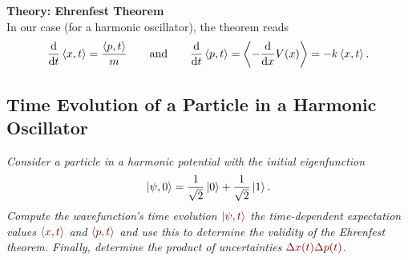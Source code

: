 \documentclass[11pt, a4paper]{article}
\newcommand{\dmath}[1]{\textcolor{Maroon}{#1}}  %
\newcommand{\eqtext}[1]{\qquad \text{#1} \qquad}
\begin{document}
\textbf{Theory: Ehrenfest Theorem}\\
In our case (for a harmonic oscillator), the theorem reads
\begin{equation*}
	\dv{t}\ev{x, t} = \frac{\ev{p, t}}{m} \eqtext{and} \dv{t}\ev{p, t} = \ev{-\dv{x}V(x)} = -k\ev{x, t}.
\end{equation*}

\subsection{Time Evolution of a Particle in a Harmonic Oscillator}
\textit{Consider a particle in a harmonic potential with the initial eigenfunction}
\begin{equation*}
	\ket{\psi, 0} = \frac{1}{\sqrt{2}}\ket{0} + \frac{1}{\sqrt{2}}\ket{1}.
\end{equation*}
\textit{Compute the wavefunction's time evolution $ \dmath{\ket{\psi, t}} $ the time-dependent expectation values $ \dmath{\ev{x, t}} $ and $ \dmath{\ev{p, t}} $ and use this to determine the validity of the Ehrenfest theorem. Finally, determine the product of uncertainties $ \dmath{\Delta x(t) \Delta p(t)} $}.
\end{document}

